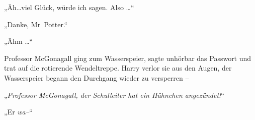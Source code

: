 „Äh…viel Glück, würde ich sagen. Also …“

„Danke, Mr~Potter.“

„Ähm …“

Professor McGonagall ging zum Wasserspeier, sagte unhörbar das Passwort und trat auf die rotierende Wendeltreppe. Harry verlor sie aus den Augen, der Wasserspeier begann den Durchgang wieder zu versperren –

„\emph{Professor McGonagall, der Schulleiter hat ein Hühnchen angezündet!}“

„Er \emph{wa–}“

